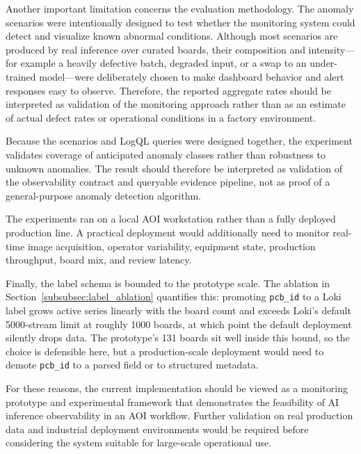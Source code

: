 \documentclass[12pt,a4paper]{article}
\begin{document}
Another important limitation concerns the evaluation methodology. The anomaly scenarios were intentionally designed to test whether the monitoring system could detect and visualize known abnormal conditions. Although most scenarios are produced by real inference over curated boards, their composition and intensity---for example a heavily defective batch, degraded input, or a swap to an under-trained model---were deliberately chosen to make dashboard behavior and alert responses easy to observe. Therefore, the reported aggregate rates should be interpreted as validation of the monitoring approach rather than as an estimate of actual defect rates or operational conditions in a factory environment.

Because the scenarios and LogQL queries were designed together, the experiment
validates coverage of anticipated anomaly classes rather than robustness to
unknown anomalies. The result should therefore be interpreted as validation of
the observability contract and queryable evidence pipeline, not as proof of a
general-purpose anomaly detection algorithm.

The experiments ran on a local AOI workstation rather than a fully deployed
production line. A practical deployment would additionally need to monitor
real-time image acquisition, operator variability, equipment state, production
throughput, board mix, and review latency.

Finally, the label schema is bounded to the prototype scale. The ablation in
Section~\ref{subsubsec:label_ablation} quantifies this: promoting \texttt{pcb\_id}
to a Loki label grows active series linearly with the board count and exceeds
Loki's default 5000-stream limit at roughly 1000 boards, at which point the
default deployment silently drops data. The prototype's 131 boards sit well
inside this bound, so the choice is defensible here, but a production-scale
deployment would need to demote \texttt{pcb\_id} to a parsed field or to
structured metadata.

For these reasons, the current implementation should be viewed as a monitoring prototype and experimental framework that demonstrates the feasibility of AI inference observability in an AOI workflow. Further validation on real production data and industrial deployment environments would be required before considering the system suitable for large-scale operational use.
\end{document}
